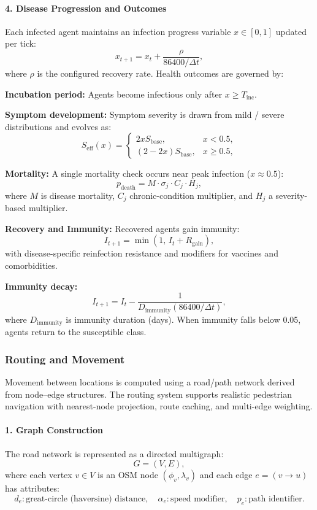 \paragraph*{4. Disease Progression and Outcomes}

Each infected agent maintains an infection progress variable $x \in [0,1]$ updated per tick:
\[
x_{t+1} = x_t + \frac{\rho}{86400 / \Delta t},
\]
where $\rho$ is the configured recovery rate. Health outcomes are governed by:

\textbf{Incubation period:} Agents become infectious only after $x \ge T_\mathrm{inc}$.

\textbf{Symptom development:} Symptom severity is drawn from mild / severe distributions and evolves as:
\[
S_\mathrm{eff}(x) =
\begin{cases}
2x S_\mathrm{base}, & x < 0.5,\\[4pt]
(2 - 2x) S_\mathrm{base}, & x \ge 0.5,
\end{cases}
\]

\textbf{Mortality:} A single mortality check occurs near peak infection ($x \approx 0.5$):
\[
p_\mathrm{death} = M \cdot \sigma_j \cdot C_j \cdot H_j,
\]
where $M$ is disease mortality, $C_j$ chronic-condition multiplier, and $H_j$ a severity-based multiplier.

\textbf{Recovery and Immunity:}
Recovered agents gain immunity:
\[
I_{t+1} = \min(1,\, I_t + R_\mathrm{gain}),
\]
with disease-specific reinfection resistance and modifiers for vaccines and comorbidities.

\textbf{Immunity decay:}
\[
I_{t+1} = I_t - \frac{1}{D_\mathrm{immunity}(86400 / \Delta t)},
\]
where $D_\mathrm{immunity}$ is immunity duration (days). When immunity falls below 0.05, agents return to the susceptible class.

\subsubsection*{Routing and Movement}

Movement between locations is computed using a road/path network derived from node–edge structures. The routing system supports realistic pedestrian navigation with nearest-node projection, route caching, and multi-edge weighting.

\paragraph*{1. Graph Construction}
The road network is represented as a directed multigraph:
\[
G = (V, E),
\]
where each vertex $v \in V$ is an OSM node $(\phi_v, \lambda_v)$ and each edge $e=(v \to u)$ has attributes:
\[
d_e: \text{great-circle (haversine) distance}, \quad
\alpha_e: \text{speed modifier}, \quad
p_e: \text{path identifier}.
\]

